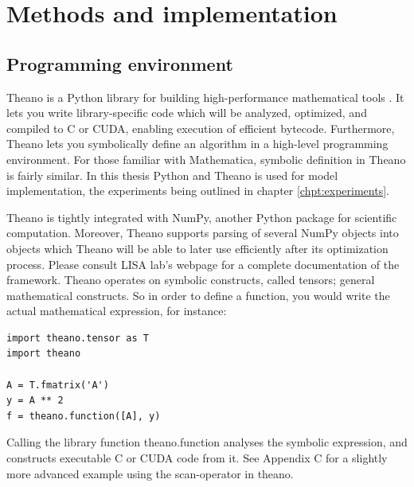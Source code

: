 
\chapter{Methods and implementation}\label{chpt:methods}

\section{Programming environment}

Theano is a Python library for building high-performance mathematical tools \citep{Bergstra2010}. It lets you write library-specific code which will be analyzed, optimized, and compiled to C or CUDA, enabling execution of efficient bytecode. Furthermore, Theano lets you symbolically define an algorithm in a high-level programming environment. For those familiar with Mathematica, symbolic definition in Theano is fairly similar. In this thesis Python and Theano is used for model implementation, the experiments being outlined in chapter \ref{chpt:experiments}.

Theano is tightly integrated with NumPy, another Python package for scientific computation. Moreover, Theano supports parsing of several NumPy objects into objects which Theano will be able to later use efficiently after its optimization process. Please consult LISA lab's webpage \citep{LISA-lab2015a} for a complete documentation of the framework.
Theano operates on symbolic constructs, called tensors; general mathematical constructs. So in order to define a function, you would write the actual mathematical expression, for instance:

\begin{verbatim}
import theano.tensor as T
import theano

A = T.fmatrix('A')
y = A ** 2
f = theano.function([A], y)
\end{verbatim}

Calling the library function theano.function analyses the symbolic expression, and constructs executable C or CUDA code from it. See Appendix C for a slightly more advanced example using the scan-operator in theano.

